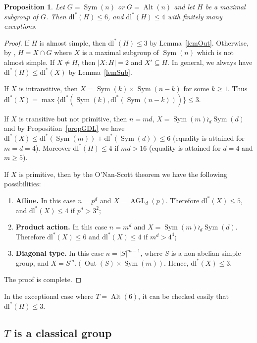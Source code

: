 \documentclass[11pt]{amsart}
\numberwithin{equation}{section}
\newtheorem{proposition}[theorem]{Proposition}
\theoremstyle{definition}
\theoremstyle{remark}
\newcommand{\Sym}{\mathop{\mathrm{Sym}}}
\newcommand{\Alt}{\mathop{\mathrm{Alt}}}
\newcommand{\AGL}{\mathop{\mathrm{AGL}}}
\newcommand{\Out}{\mathop{\mathrm{Out}}}
\newcommand{\dll}{\mathrm{dl^*}}
\begin{document}
\begin{proposition}
Let $G=\Sym(n)$ or $G=\Alt(n)$ and let $H$ be a maximal subgroup of $G$.
Then $\dll(H) \leq 6$, and $\dll(H) \leq 4$ with finitely many exceptions.
\end{proposition}
\begin{proof}
If $H$ is almost simple, then $\dll(H) \leq 3$ by Lemma~\ref{lemOut}.
Otherwise, by \cite{LPS87}, $H = X \cap G$ where $X$ is a maximal subgroup of $\Sym(n)$ which is not almost simple. If $X \neq H$, then $|X:H| =2$ and $X' \subseteq H$.
In general, we always have $\dll(H) \leq \dll(X)$ by Lemma~\ref{lemSub}.

If $X$ is intransitive, then $X = \Sym(k) \times \Sym(n-k)$ for some $k \geq 1$. Thus $\dll(X) = \max \{ \dll(\Sym(k),\dll(\Sym(n-k))) \} \leq 3$.

If $X$ is transitive but not primitive, then $n=md$, $X= \Sym(m) \wr_d \Sym(d)$ and by Proposition~\ref{propGDL} we have $\dll(X) \leq \dll(\Sym(m)) + \dll(\Sym(d)) \leq 6$
(equality is attained for $m=d=4$).
Moreover $\dll(H) \leq 4$ if $md > 16$
(equality is attained for $d=4$ and $m \geq 5$).

If $X$ is primitive,
then by the O'Nan-Scott theorem \cite[Sec.~4]{DM96} we have the following possibilities:
\begin{enumerate}
    \item[$\bullet$] \textbf{Affine.}
    In this case $n=p^d$ and $X = \AGL_d(p)$.
    Therefore $\dll(X) \leq 5$, and $\dll(X) \leq 4$ if $p^d >3^2$;

    \item[$\bullet$] \textbf{Product action.}
    In this case $n=m^d$ and $X = \Sym(m) \wr_d \Sym(d)$.
    Therefore $\dll(X) \leq 6$ and $\dll(X) \leq 4$ if $m^d > 4^4$;
    
    \item[$\bullet$] \textbf{Diagonal type.}
    In this case $n=|S|^{m-1}$, where $S$ is a non-abelian simple group, and $X = S^m.(\Out(S) \times \Sym(m))$. Hence, $\dll(X) \leq 3$.
\end{enumerate}

The proof is complete.
\end{proof}

In the exceptional case where $T=\Alt(6)$, it can be checked easily that $\dll(H) \leq 3$.








\subsection{$T$ is a classical group} 
\end{document}
